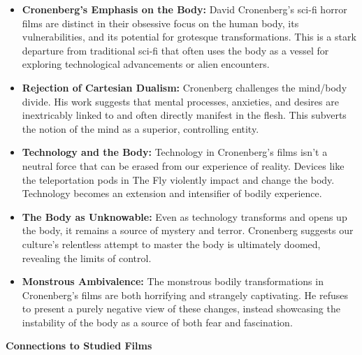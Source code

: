 \documentclass[11pt,fleqn]{book} %
\begin{document}
\begin{itemize}
\item \textbf{Cronenberg's Emphasis on the Body:} David Cronenberg's sci-fi horror films are distinct in their obsessive focus on the human body, its vulnerabilities, and its potential for grotesque transformations. This is a stark departure from traditional sci-fi that often uses the body as a vessel for exploring technological advancements or alien encounters.

\item \textbf{Rejection of Cartesian Dualism:} Cronenberg challenges the mind/body divide. His work suggests that mental processes, anxieties, and desires are inextricably linked to and often directly manifest in the flesh. This subverts the notion of the mind as a superior, controlling entity. 

\item \textbf{Technology and the Body:} Technology in Cronenberg's films isn't a neutral force that can be erased from our experience of reality. Devices like the teleportation pods in The Fly violently impact and change the body. Technology becomes an extension and intensifier of bodily experience. 

\item \textbf{The Body as Unknowable:} Even as technology transforms and opens up the body, it remains a source of mystery and terror. Cronenberg suggests our culture's relentless attempt to master the body is ultimately doomed, revealing the limits of control. 

\item \textbf{Monstrous Ambivalence:} The monstrous bodily transformations in Cronenberg's films are both horrifying and strangely captivating. He refuses to present a purely negative view of these changes, instead showcasing the instability of the body as a source of both fear and fascination.
\end{itemize}
\vspace{5pt}
\textbf{Connections to Studied Films}
\end{document}
